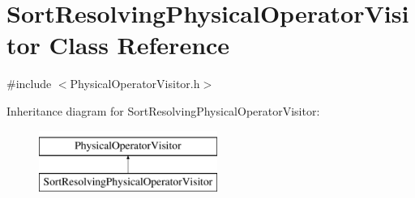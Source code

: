 \hypertarget{class_sort_resolving_physical_operator_visitor}{\section{Sort\+Resolving\+Physical\+Operator\+Visitor Class Reference}
\label{class_sort_resolving_physical_operator_visitor}
}


{\ttfamily \#include $<$Physical\+Operator\+Visitor.\+h$>$}

Inheritance diagram for Sort\+Resolving\+Physical\+Operator\+Visitor\+:\begin{figure}[H]
\begin{center}
\leavevmode
\includegraphics[height=2.000000cm]{class_sort_resolving_physical_operator_visitor}
\end{center}
\end{figure}
